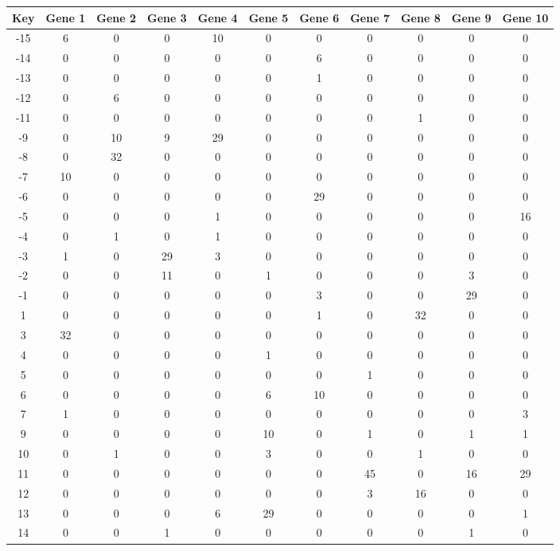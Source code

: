 \begin{tabular}{|c|c|c|c|c|c|c|c|c|c|c|}
\hline
Key & Gene 1 & Gene 2 & Gene 3 & Gene 4 & Gene 5 & Gene 6 & Gene 7 & Gene 8 & Gene 9 & Gene 10 \\
\hline
-15 & 6 & 0 & 0 & 10 & 0 & 0 & 0 & 0 & 0 & 0 \\
-14 & 0 & 0 & 0 & 0 & 0 & 6 & 0 & 0 & 0 & 0 \\
-13 & 0 & 0 & 0 & 0 & 0 & 1 & 0 & 0 & 0 & 0 \\
-12 & 0 & 6 & 0 & 0 & 0 & 0 & 0 & 0 & 0 & 0 \\
-11 & 0 & 0 & 0 & 0 & 0 & 0 & 0 & 1 & 0 & 0 \\
-9 & 0 & 10 & 9 & 29 & 0 & 0 & 0 & 0 & 0 & 0 \\
-8 & 0 & 32 & 0 & 0 & 0 & 0 & 0 & 0 & 0 & 0 \\
-7 & 10 & 0 & 0 & 0 & 0 & 0 & 0 & 0 & 0 & 0 \\
-6 & 0 & 0 & 0 & 0 & 0 & 29 & 0 & 0 & 0 & 0 \\
-5 & 0 & 0 & 0 & 1 & 0 & 0 & 0 & 0 & 0 & 16 \\
-4 & 0 & 1 & 0 & 1 & 0 & 0 & 0 & 0 & 0 & 0 \\
-3 & 1 & 0 & 29 & 3 & 0 & 0 & 0 & 0 & 0 & 0 \\
-2 & 0 & 0 & 11 & 0 & 1 & 0 & 0 & 0 & 3 & 0 \\
-1 & 0 & 0 & 0 & 0 & 0 & 3 & 0 & 0 & 29 & 0 \\
1 & 0 & 0 & 0 & 0 & 0 & 1 & 0 & 32 & 0 & 0 \\
3 & 32 & 0 & 0 & 0 & 0 & 0 & 0 & 0 & 0 & 0 \\
4 & 0 & 0 & 0 & 0 & 1 & 0 & 0 & 0 & 0 & 0 \\
5 & 0 & 0 & 0 & 0 & 0 & 0 & 1 & 0 & 0 & 0 \\
6 & 0 & 0 & 0 & 0 & 6 & 10 & 0 & 0 & 0 & 0 \\
7 & 1 & 0 & 0 & 0 & 0 & 0 & 0 & 0 & 0 & 3 \\
9 & 0 & 0 & 0 & 0 & 10 & 0 & 1 & 0 & 1 & 1 \\
10 & 0 & 1 & 0 & 0 & 3 & 0 & 0 & 1 & 0 & 0 \\
11 & 0 & 0 & 0 & 0 & 0 & 0 & 45 & 0 & 16 & 29 \\
12 & 0 & 0 & 0 & 0 & 0 & 0 & 3 & 16 & 0 & 0 \\
13 & 0 & 0 & 0 & 6 & 29 & 0 & 0 & 0 & 0 & 1 \\
14 & 0 & 0 & 1 & 0 & 0 & 0 & 0 & 0 & 1 & 0 \\
\hline
\end{tabular}